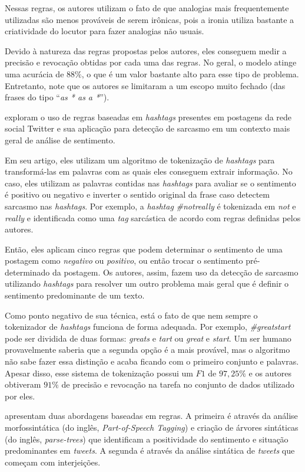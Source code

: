 Nessas regras, os autores utilizam o fato de que analogias mais frequentemente
utilizadas são menos prováveis de serem irônicas, pois a ironia utiliza bastante
a criatividade do locutor para fazer analogias não usuais.

Devido à natureza das regras propostas pelos autores, eles conseguem medir a
precisão e revocação obtidas por cada uma das regras. No geral, o modelo atinge
uma acurácia de $88\%$, o que é um valor bastante alto para esse tipo de
problema. Entretanto, note que os autores se limitaram a um escopo muito fechado
(das frases do tipo ``\textit{as * as a *}'').

\cite{maynard-greenwood:2014:cares} exploram o uso de regras baseadas em
\textit{hashtags} presentes em postagens da rede social Twitter e sua aplicação
para detecção de sarcasmo em um contexto mais geral de análise de sentimento.

Em seu artigo, eles utilizam um algoritmo de tokenização de \textit{hashtags}
para transformá-las em palavras com as quais eles conseguem extrair informação.
No caso, eles utilizam as palavras contidas nas \textit{hashtags} para avaliar
se o sentimento é positivo ou negativo e inverter o sentido original da frase
caso detectem sarcasmo nas \textit{hashtags}. Por exemplo, a \textit{hashtag}
\textit{\#notreally} é tokenizada em \textit{not} e \textit{really} e
identificada como uma \textit{tag} sarcástica de acordo com regras definidas
pelos autores.

Então, eles aplicam cinco regras que podem determinar o sentimento de uma
postagem como \textit{negativo} ou \textit{positivo}, ou então trocar o
sentimento pré-determinado da postagem. Os autores, assim, fazem uso da detecção
de sarcasmo utilizando \textit{hashtags} para resolver um outro problema mais
geral que é definir o sentimento predominante de um texto.

Como ponto negativo de sua técnica, está o fato de que nem sempre o tokenizador
de \textit{hashtags} funciona de forma adequada. Por exemplo,
\textit{\#greatstart} pode ser dividida de duas formas: \textit{greats} e
\textit{tart} ou \textit{great} e \textit{start}. Um ser humano provavelmente
saberia que a segunda opção é a mais provável, mas o algoritmo não sabe fazer
essa distinção e acaba ficando com o primeiro conjunto e palavras. Apesar disso,
esse sistema de tokenização possui um $F1$ de $97,25\%$ e os autores obtiveram
$91\%$ de precisão e revocação na tarefa no conjunto de dados utilizado por
eles.

\cite{bharti-etal:2015:parsing-sarcasm} apresentam duas abordagens baseadas em
regras. A primeira é através da análise morfossintática (do inglês,
\textit{Part-of-Speech Tagging}) e criação de árvores sintáticas (do inglês,
\textit{parse-trees}) que identificam a positividade do sentimento e situação
predominantes em \textit{tweets}. A segunda é através da análise sintática de
\textit{tweets} que começam com interjeições.

